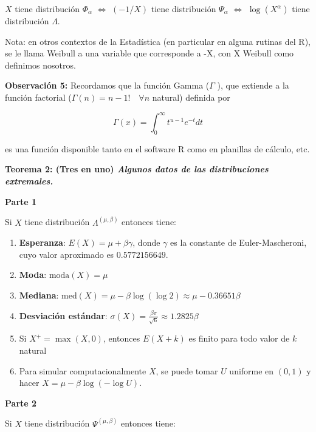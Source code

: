 \documentclass[
]{book}
\theoremstyle{definition}
\theoremstyle{definition}
\theoremstyle{definition}
\theoremstyle{definition}
\theoremstyle{remark}
\begin{document}
\(X\) tiene distribución \(\Phi_{\alpha}\) \(\Leftrightarrow\) \((-1/X)\) tiene distribución \(\Psi_{\alpha}\) \(\Leftrightarrow\) \(\log(X^{\alpha})\) tiene distribución \(\Lambda\).

Nota: en otros contextos de la Estadística (en particular en
alguna rutinas del R), se le llama Weibull a una variable que
corresponde a -X, con X Weibull como definimos nosotros.

\textbf{Observación 5:} Recordamos que la función
Gamma (\(\Gamma\) ), que extiende a la función factorial
(\(\Gamma(n)=n-1!\quad \forall n\) natural) definida por

\begin{equation}
\Gamma(x)=\int_{0}^{\infty} t^{u-1}e^{-t}dt
\end{equation}

es una función disponible tanto en el software R
como en planillas de cálculo, etc.

\textbf{Teorema 2: (Tres en uno) \emph{Algunos datos de las
distribuciones extremales.}}

\textbf{Parte 1}

Si \(X\) tiene distribución \(\Lambda^{(\mu,\beta)}\) entonces tiene:

\begin{enumerate}
\def\labelenumi{\alph{enumi})}
\item
  \textbf{Esperanza}: \(E(X) = \mu + \beta\gamma\), donde \(\gamma\) es la constante de Euler-Mascheroni, cuyo valor aproximado es \(0.5772156649\).
\item
  \textbf{Moda}: \(\text{moda}(X)=\mu\)
\item
  \textbf{Mediana}: \(\text{med}(X)=\mu - \beta \log(\log 2) \approx \mu - 0.36651 \beta\)
\item
  \textbf{Desviación estándar}: \(\sigma(X)=\frac{\beta \pi}{\sqrt{6}}   \approx 1.2825 \beta\)
\item
  Si \(X^+ = \max(X,0)\), entonces \(E(X+k)\) es finito para todo valor de \(k\) natural
\item
  Para simular computacionalmente \(X\), se puede tomar \(U\) uniforme en \((0,1)\) y hacer \(X = \mu - \beta \log(-\log U)\).
\end{enumerate}

\textbf{Parte 2}

Si \(X\) tiene distribución \(\Psi^{(\mu, \beta)}\) entonces tiene:
\end{document}
